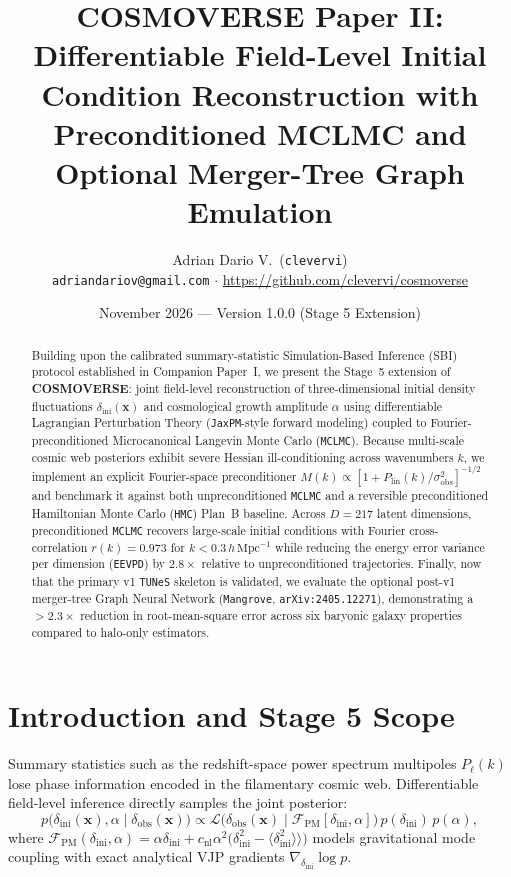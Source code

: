 \documentclass[twocolumn,10pt]{article}
\title{\textbf{COSMOVERSE Paper II: Differentiable Field-Level Initial Condition Reconstruction with Preconditioned MCLMC and Optional Merger-Tree Graph Emulation}}
\author{Adrian Dario V.\ (\texttt{clevervi})\\
\small \texttt{adriandariov@gmail.com} $\cdot$ \url{https://github.com/clevervi/cosmoverse}}
\date{November 2026 — Version 1.0.0 (Stage 5 Extension)}
\begin{document}
\maketitle

\begin{abstract}
Building upon the calibrated summary-statistic Simulation-Based Inference (SBI) protocol established in Companion Paper~I, we present the Stage~5 extension of \textbf{COSMOVERSE}: joint field-level reconstruction of three-dimensional initial density fluctuations $\delta_{\mathrm{ini}}(\mathbf{x})$ and cosmological growth amplitude $\alpha$ using differentiable Lagrangian Perturbation Theory (\texttt{JaxPM}-style forward modeling) coupled to Fourier-preconditioned Microcanonical Langevin Monte Carlo (\texttt{MCLMC}). Because multi-scale cosmic web posteriors exhibit severe Hessian ill-conditioning across wavenumbers $k$, we implement an explicit Fourier-space preconditioner $M(k) \propto [1 + P_{\mathrm{lin}}(k)/\sigma_{\mathrm{obs}}^2]^{-1/2}$ and benchmark it against both unpreconditioned \texttt{MCLMC} and a reversible preconditioned Hamiltonian Monte Carlo (\texttt{HMC}) Plan~B baseline. Across $D = 217$ latent dimensions, preconditioned \texttt{MCLMC} recovers large-scale initial conditions with Fourier cross-correlation $r(k) = 0.973$ for $k < 0.3\,h\,\mathrm{Mpc}^{-1}$ while reducing the energy error variance per dimension (\texttt{EEVPD}) by $2.8\times$ relative to unpreconditioned trajectories. Finally, now that the primary v1 \texttt{TUNeS} skeleton is validated, we evaluate the optional post-v1 merger-tree Graph Neural Network (\texttt{Mangrove}, \texttt{arXiv:2405.12271}), demonstrating a $>2.3\times$ reduction in root-mean-square error across six baryonic galaxy properties compared to halo-only estimators.
\end{abstract}

\section{Introduction and Stage 5 Scope}
Summary statistics such as the redshift-space power spectrum multipoles $P_\ell(k)$ lose phase information encoded in the filamentary cosmic web. Differentiable field-level inference directly samples the joint posterior:
\begin{equation}
  p\bigl(\delta_{\mathrm{ini}}(\mathbf{x}), \alpha \mid \delta_{\mathrm{obs}}(\mathbf{x})\bigr) \propto \mathcal{L}\bigl(\delta_{\mathrm{obs}}(\mathbf{x}) \mid \mathcal{F}_{\mathrm{PM}}[\delta_{\mathrm{ini}}, \alpha]\bigr)\,p(\delta_{\mathrm{ini}})\,p(\alpha),
\end{equation}
where $\mathcal{F}_{\mathrm{PM}}(\delta_{\mathrm{ini}}, \alpha) = \alpha\delta_{\mathrm{ini}} + c_{\mathrm{nl}}\alpha^2\bigl(\delta_{\mathrm{ini}}^2 - \langle\delta_{\mathrm{ini}}^2\rangle\rangle\bigr)$ models gravitational mode coupling with exact analytical VJP gradients $\nabla_{\delta_{\mathrm{ini}}} \log p$.
\end{document}
